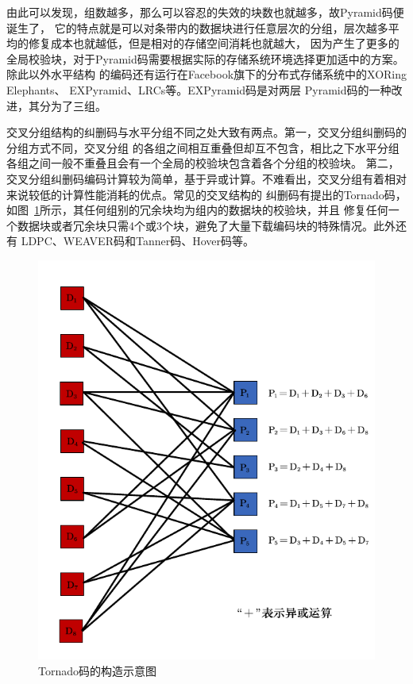 由此可以发现，组数越多，那么可以容忍的失效的块数也就越多，故Pyramid码\cite{huang2013pyramid}便诞生了，
它的特点就是可以对条带内的数据块进行任意层次的分组，层次越多平均的修复成本也就越低，但是相对的存储空间消耗也就越大，
因为产生了更多的全局校验块，对于Pyramid码需要根据实际的存储系统环境选择更加适中的方案。除此以外水平结构
的编码还有运行在Facebook旗下的分布式存储系统中的XORing Elephants\cite{sathiamoorthy2013xoring}、
EXPyramid\cite{周松2011expyramid}、LRCs\cite{sathiamoorthy2013xoring}等。EXPyramid码是对两层
Pyramid码的一种改进，其分为了三组。

交叉分组结构的纠删码与水平分组不同之处大致有两点。第一，交叉分组纠删码的分组方式不同，交叉分组
的各组之间相互重叠但却互不包含，相比之下水平分组各组之间一般不重叠且会有一个全局的校验块包含着各个分组的校验块。
第二，交叉分组纠删码编码计算较为简单，基于异或计算。不难看出，交叉分组有着相对来说较低的计算性能消耗的优点。常见的交叉结构的
纠删码有\citet{woitaszek2007tornado}提出的Tornado码，如图~\ref{fig:con-1.8}所示，其任何组别的冗余块均为组内的数据块的校验块，并且
修复任何一个数据块或者冗余块只需4个或3个块，避免了大量下载编码块的特殊情况。此外还有
LDPC\cite{gallager1962low}、WEAVER码\cite{hafner2005weaver}和Tanner码、Hover码\cite{hafner2006hover}等。

\begin{figure}[htbp]
	\centering
	\includegraphics [scale=0.7]{figures/1.8.pdf}
	\caption{Tornado码的构造示意图}
	\label{fig:con-1.8}
\end{figure}


